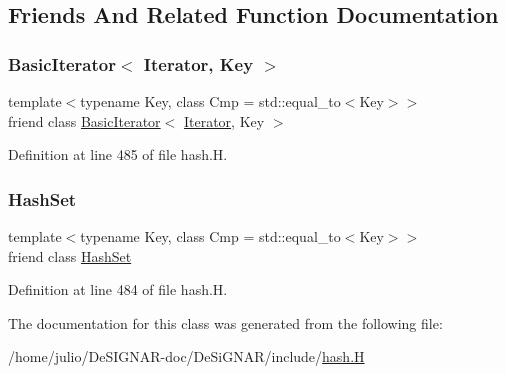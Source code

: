 \subsection{Friends And Related Function Documentation}
\mbox{\label{class_designar_1_1_hash_set_1_1_iterator_a0b375a570add16b09037ce1773f0ddbb}} 
\subsubsection{\texorpdfstring{Basic\+Iterator$<$ Iterator, Key $>$}{BasicIterator< Iterator, Key >}}
{\footnotesize\ttfamily template$<$typename Key, class Cmp = std\+::equal\+\_\+to$<$\+Key$>$$>$ \\
friend class \hyperlink{class_designar_1_1_basic_iterator}{Basic\+Iterator}$<$ \hyperlink{class_designar_1_1_hash_set_1_1_iterator}{Iterator}, Key $>$\hspace{0.3cm}{\ttfamily [friend]}}



Definition at line 485 of file hash.\+H.

\mbox{\label{class_designar_1_1_hash_set_1_1_iterator_ac5220f06200dc3b0d55d050a940f17b9}} 
\subsubsection{\texorpdfstring{Hash\+Set}{HashSet}}
{\footnotesize\ttfamily template$<$typename Key, class Cmp = std\+::equal\+\_\+to$<$\+Key$>$$>$ \\
friend class \hyperlink{class_designar_1_1_hash_set}{Hash\+Set}\hspace{0.3cm}{\ttfamily [friend]}}



Definition at line 484 of file hash.\+H.



The documentation for this class was generated from the following file\+:\begin{DoxyCompactItemize}
\item 
/home/julio/\+De\+S\+I\+G\+N\+A\+R-\/doc/\+De\+Si\+G\+N\+A\+R/include/\hyperlink{hash_8_h}{hash.\+H}\end{DoxyCompactItemize}
